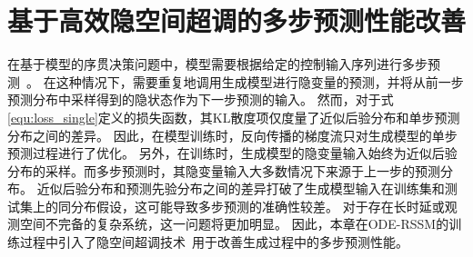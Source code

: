 \section{基于高效隐空间超调的多步预测性能改善}
\label{sec:5_overshooting}
在基于模型的序贯决策问题中，模型需要根据给定的控制输入序列进行多步预测~\cite{Hafner2019}。
在这种情况下，需要重复地调用生成模型进行隐变量的预测，并将从前一步预测分布中采样得到的隐状态作为下一步预测的输入。
然而，对于式\eqref{equ:loss_single}定义的损失函数，其KL散度项仅度量了近似后验分布和单步预测分布之间的差异。
因此，在模型训练时，反向传播的梯度流只对生成模型的单步预测过程进行了优化。
另外，在训练时，生成模型的隐变量输入始终为近似后验分布的采样。而多步预测时，其隐变量输入大多数情况下来源于上一步的预测分布。
近似后验分布和预测先验分布之间的差异打破了生成模型输入在训练集和测试集上的同分布假设，这可能导致多步预测的准确性较差\cite{venkatraman2015}。
对于存在长时延或观测空间不完备的复杂系统，这一问题将更加明显。
因此，本章在ODE-RSSM的训练过程中引入了隐空间超调技术~\cite{Hafner2019}用于改善生成过程中的多步预测性能。

